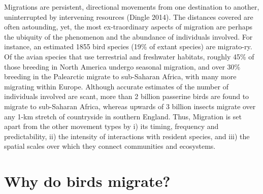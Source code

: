 \documentclass[
]{book}
\begin{document}
Migrations are persistent, directional movements from one destination to another, uninterrupted by intervening resources (Dingle 2014). The distances covered are often astounding, yet, the most ex-traordinary aspects of migration are perhaps the ubiquity of the phenomenon and the abundance of individuals involved. For instance, an estimated 1855 bird species (19\% of extant species) are migrato-ry. Of the avian species that use terrestrial and freshwater habitats, roughly 45\% of those breeding in North America undergo seasonal migration, and over 30\% breeding in the Palearctic migrate to sub-Saharan Africa, with many more migrating within Europe. Although accurate estimates of the number of individuals involved are scant, more than 2 billion passerine birds are found to migrate to sub-Saharan Africa, whereas upwards of 3 billion insects migrate over any 1-km stretch of countryside in southern England. Thus, Migration is set apart from the other movement types by i) its timing, frequency and predictability, ii) the intensity of interactions with resident species, and iii) the spatial scales over which they connect communities and ecosystems.

\hypertarget{why-do-birds-migrate}{%
\section{Why do birds migrate?}\label{why-do-birds-migrate}}
\end{document}
